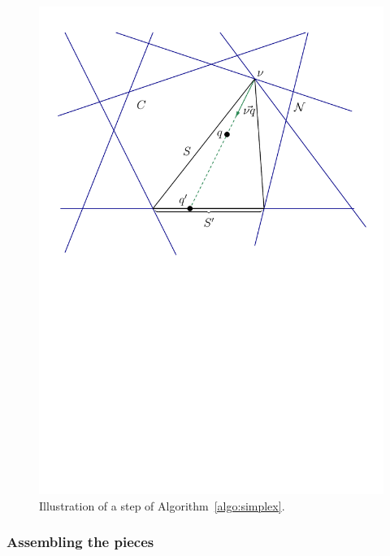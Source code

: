 \begin{figure}
\begin{center}
\includegraphics[trim=90 47 50 13,clip=true,height=0.25\textheight]{figures/simplex}
\caption{%
Illustration of a step of Algorithm~\ref{algo:simplex}.
}
\label{fig:meiser:step}
\end{center}
\end{figure}

\subsubsection{Assembling the pieces}

